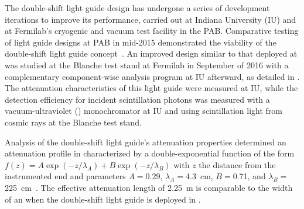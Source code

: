 
The double-shift light guide design has undergone a series of development iterations to improve its performance, carried out at Indiana University (IU) and at Fermilab's cryogenic and vacuum test facility in the PAB. Comparative testing of light guide designs at PAB in mid-2015 demonstrated the viability of the double-shift light guide concept~\cite{bib:JINST-11-C05019}. 
An improved design similar to that deployed at  was studied at the Blanche test stand at Fermilab in September of 2016 with a complementary component-wise analysis program at IU afterward, as detailed in \cite{bib:DoubleShiftLG-NIM-171113}. The attenuation characteristics of this light guide were measured at IU, while the  detection efficiency for incident \lar scintillation photons was measured with a vacuum-ultraviolet () monochromator at IU and using scintillation light from cosmic rays at the Blanche test stand.


Analysis of the double-shift light guide's attenuation properties determined an attenuation profile in \lar characterized by a double-exponential function of the form $f(z) = A \exp(-z/\lambda_{A}) + B \exp(-z/\lambda_B)$ with $z$ the distance from the instrumented end and parameters $A = $0.29, $\lambda_A = $4.3~cm, $B = $0.71, and $\lambda_B = $225~cm~\cite{bib:DoubleShiftLG-NIM-171113}. The effective attenuation length of \SI{2.25}{m} is comparable to the width of an  when the double-shift light guide is deployed in \lar.


